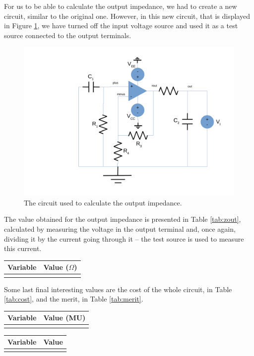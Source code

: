 For us to be able to calculate the output impedance, we had to create a new circuit, similar to the original one. However, in this new circuit, that is displayed in Figure \ref{fig:circuit-out}, we have turned off the input voltage source and used it as a test source connected to the output terminals.

\begin{figure}[H] \centering
\includegraphics[width=0.6\linewidth]{circuit-out.pdf}
\caption{The circuit used to calculate the output impedance.}
\label{fig:circuit-out}
\end{figure}

The value obtained for the output impedance is presented in Table \ref{tab:zout}, calculated by measuring the voltage in the output terminal and, once again, dividing it by the current going through it -- the test source is used to measure this current.

\begin{center}
\begin{tabular}{|l|r|}
  \hline    
  {\bf Variable} & {\bf Value ($\Omega$)} \\ \hline
  
  \label{tab:zout}
\end{tabular}
\end{center}

Some last final interesting values are the cost of the whole circuit, in Table \ref{tab:cost}, and the merit, in Table \ref{tab:merit}.

\begin{center}
\begin{tabular}{|l|r|}
  \hline    
  {\bf Variable} & {\bf Value (MU)} \\ \hline
  
  \label{tab:cost}
\end{tabular}
\end{center}

\begin{center}
\begin{tabular}{|l|r|}
  \hline    
  {\bf Variable} & {\bf Value} \\ \hline
  
  \label{tab:merit}
\end{tabular}
\end{center}
